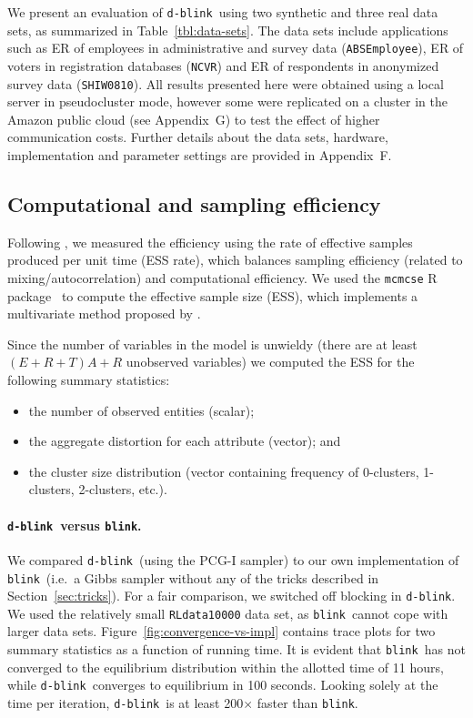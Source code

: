 \documentclass[12pt,letterpaper]{article}
\newcommand{\1}[1]{\mathbb{I}\!\left[#1\right]} %
\newcommand{\dblink}{\texttt{\upshape \lowercase{d-blink}}} %
\newcommand{\blink}{\texttt{\upshape \lowercase{blink}}} %
\begin{document}
We present an evaluation of \dblink\ using two synthetic and three real 
data sets, as summarized in Table~\ref{tbl:data-sets}. 
The data sets include applications such as ER of employees in administrative 
and survey data (\texttt{ABSEmployee}), ER of voters in registration 
databases (\texttt{NCVR}) and ER of respondents in anonymized survey 
data (\texttt{SHIW0810}).
All results presented here were obtained using a local server in pseudocluster 
mode, however some were replicated on a cluster in the Amazon public cloud 
(see Appendix~G) to test the effect of higher communication costs.
Further details about the data sets, hardware, implementation and parameter 
settings are provided in Appendix~F.

\subsection{Computational and sampling efficiency}
\label{sec:efficiency-expts}
Following \cite{turek_efficient_2016}, we measured the efficiency using the 
rate of effective samples produced per unit time (ESS rate), which 
balances sampling efficiency (related to mixing\slash autocorrelation) and 
computational efficiency.
We used the \texttt{mcmcse} R package~\citep{mcmcse} to compute the 
effective sample size (ESS), which implements a multivariate method 
proposed by \citet{vats_multivariate_2019}.

Since the number of variables in the model is unwieldy (there are at least 
$(E + R + T) A + R$ unobserved variables) we computed the ESS for the 
following summary statistics:
\begin{itemize}
  \item the number of observed entities (scalar);
  \item the aggregate distortion for each attribute (vector); and
  \item the cluster size distribution (vector containing 
  frequency of 0-clusters, 1-clusters, 2-clusters, etc.).
\end{itemize}

\paragraph{\dblink\ versus \blink.}
We compared \dblink\ (using the PCG-I sampler) to our own implementation of 
\blink\ (i.e.\ a Gibbs sampler without any of the tricks described in 
Section~\ref{sec:tricks}).
For a fair comparison, we switched off blocking in \dblink.
We used the relatively small \texttt{RLdata10000} data set, as \blink\ 
cannot cope with larger data sets.
Figure~\ref{fig:convergence-vs-impl} contains trace plots for two 
summary statistics as a function of running time.
It is evident that \blink\ has not converged to the equilibrium 
distribution within the allotted time of 11 hours, while \dblink\ 
converges to equilibrium in 100 seconds.
Looking solely at the time per iteration, \dblink\ is at least 200$\times$ 
faster than \blink.
\end{document}

